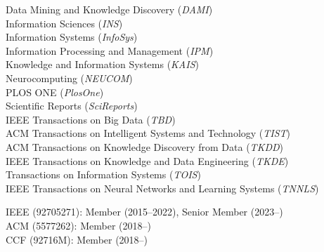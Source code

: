 \documentclass[10pt]{article}
\newenvironment{myindentpar}[1]%
{\begin{list}{}%
         {\setlength{\leftmargin}{#1}}%
         \item[]%
}
{\end{list}}
\newcounter{list}
\begin{document}
\begin{myindentpar}{0.75cm}

\hspace{-0.75cm}{\bf Journal Reviewer}

{\small

Data Mining and Knowledge Discovery (\textit{DAMI}) \\
Information Sciences (\textit{INS}) \\
Information Systems (\textit{InfoSys}) \\
Information Processing and Management (\textit{IPM}) \\
Knowledge and Information Systems (\textit{KAIS}) \\
Neurocomputing (\textit{NEUCOM}) \\
PLOS ONE (\textit{PlosOne}) \\
Scientific Reports (\textit{SciReports}) \\
IEEE Transactions on Big Data (\textit{TBD}) \\
ACM Transactions on Intelligent Systems and Technology (\textit{TIST}) \\
ACM Transactions on Knowledge Discovery from Data (\textit{TKDD}) \\
IEEE Transactions on Knowledge and Data Engineering (\textit{TKDE}) \\
Transactions on Information Systems (\textit{TOIS}) \\
IEEE Transactions on Neural Networks and Learning Systems (\textit{TNNLS})

}

\hspace{-0.75cm}{\bf Professional Membership}

{\small

IEEE (92705271): Member (2015--2022), Senior Member (2023--) \\
ACM (5577262): Member (2018--) \\
CCF (92716M): Member (2018--)

}


\end{myindentpar}
\end{document}
